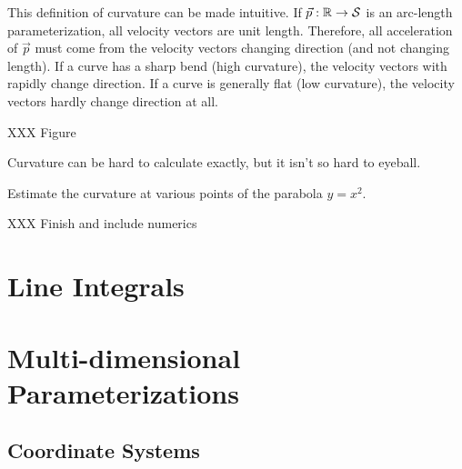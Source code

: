 This definition of curvature can be made intuitive.  If $\vec p:\mathbb{R}\to\mathcal S$ is an arc-length parameterization,
all velocity vectors are unit length.  Therefore, all acceleration of $\vec p$ must come from
the velocity vectors changing direction (and not changing length).  If a curve has a sharp bend (high curvature),
the velocity vectors with rapidly change direction.  If a curve is generally flat (low curvature),
the velocity vectors hardly change direction at all.

XXX Figure

Curvature can be hard to calculate exactly, but it isn't so hard to eyeball.

\begin{example}
	Estimate the curvature at various points of the parabola $y=x^2$.

	XXX Finish and include numerics
\end{example}

\begin{exercises}
\end{exercises}

\section{Line Integrals}

\section{Multi-dimensional Parameterizations}

\subsection{Coordinate Systems}
